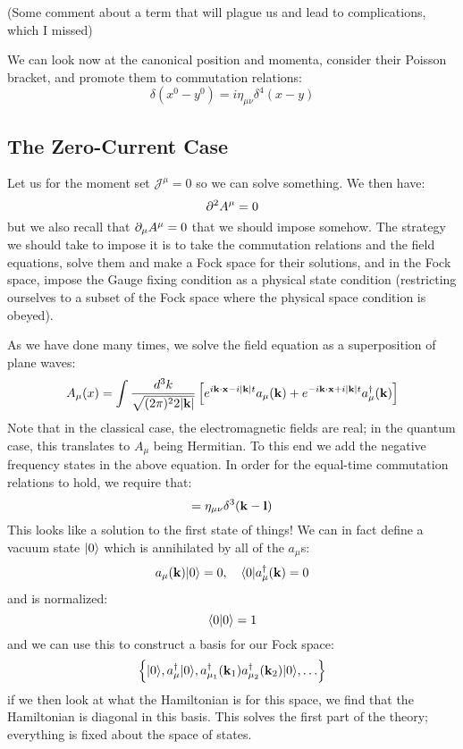 (Some comment about a term that will plague us and lead to complications, which I missed)

We can look now at the canonical position and momenta, consider their Poisson bracket, and promote them to commutation relations:
\begin{equation}
    [A_\mu(x), \dpd{}{y^0}A_\nu(y)]\delta(x^0 - y^0) = i\eta_{\mu\nu}\delta^4(x - y)
\end{equation}

\subsection{The Zero-Current Case}
Let us for the moment set $\mathcal{J}^\mu = 0$ so we can solve something. We then have:
\begin{equation}
    \partial^2 A^\mu = 0
\end{equation}
but we also recall that $\partial_\mu A^\mu = 0$ that we should impose somehow. The strategy we should take to impose it is to take the commutation relations and the field equations, solve them and make a Fock space for their solutions, and in the Fock space, impose the Gauge fixing condition as a physical state condition (restricting ourselves to a subset of the Fock space where the physical space condition is obeyed).

As we have done many times, we solve the field equation as a superposition of plane waves:
\begin{equation}
    A_\mu(x) = \int \frac{d^3k}{\sqrt{(2\pi)^2 2\lvert \mathbf{k} \rvert}}\left[e^{i\mathbf{k} \cdot \mathbf{x} - i\lvert \mathbf{k} \rvert t}a_\mu (\mathbf{k}) + e^{-i\mathbf{k} \cdot \mathbf{x} + i\lvert \mathbf{k} \rvert t}a_\mu^\dagger(\mathbf{k})\right]
\end{equation}
Note that in the classical case, the electromagnetic fields are real; in the quantum case, this translates to $A_\mu$ being Hermitian. To this end we add the negative frequency states in the above equation. In order for the equal-time commutation relations to hold, we require that:
\begin{equation}
    [a_\mu(\v{k}), a_\nu^\dag(\v{k})] = \eta_{\mu\nu}\delta^3(\v{k} - \v{l})
\end{equation}
This looks like a solution to the first state of things! We can in fact define a vacuum state $\lvert 0 \rangle$ which is annihilated by all of the $a_\mu$s:
\begin{equation}
    a_\mu(\mathbf{k})\lvert 0 \rangle = 0, \quad \langle 0 \rvert a^\dagger_\mu(\mathbf{k}) = 0
\end{equation}
and is normalized:
\begin{equation}
    \langle 0 \lvert 0 \rangle = 1
\end{equation}
and we can use this to construct a basis for our Fock space:
\begin{equation}
    \set{\lvert 0 \rangle, a^\dagger_\mu\lvert 0 \rangle, a^\dagger_{\mu_1}(\ensuremath{\mathbf{k}}_1)a^\dagger_{\mu_2}(\ensuremath{\mathbf{k}}_2)\lvert 0 \rangle, \ldots}
\end{equation}
if we then look at what the Hamiltonian is for this space, we find that the Hamiltonian is diagonal in this basis. This solves the first part of the theory; everything is fixed about the space of states.

